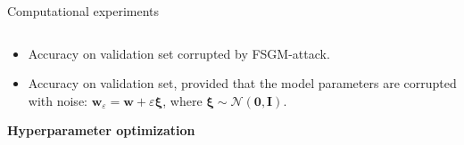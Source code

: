 \documentclass[dvipsnames,aspectratio=169]{beamer}
\begin{document}
\begin{frame}{Computational experiments}
\begin{columns}
\begin{column}{0.5\textwidth}
\begin{itemize}
        \item Accuracy on validation set corrupted by FSGM-attack.

        \item Accuracy on validation set, provided that the model parameters are corrupted with noise: ${\mathbf{w}_\varepsilon} = \mathbf{w} + \varepsilon \boldsymbol{\xi}$, where $\boldsymbol{\xi} \sim \mathcal{N} (\mathbf{0}, \mathbf{I})$.
    \end{itemize}

    \textbf{Hyperparameter optimization}

\end{column}    
\end{columns}

\end{frame}


\end{document}
